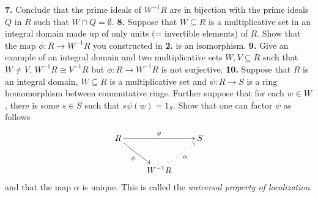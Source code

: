 \documentclass[11pt]{amsart}
\theoremstyle{theorem}
\renewcommand{\to}[1][]{\xrightarrow{\ #1\ }}
\begin{document}
\vskip 200pt
\noindent
{\bf 7.}  Conclude that the prime ideals of $W^{-1} R$ are in bijection with the prime ideals $Q$ in $R$ such that $W \cap Q = \emptyset$.
\vskip 150pt
\noindent
{\bf 8.}  Suppose that $W \subseteq R$ is a multiplicative set in an integral domain made up of only units (= invertible elements) of $R$.  Show that the map $\phi : R \to W^{-1} R$ you constructed in {\bf 2.} is an isomorphism.
\newpage
\noindent
{\bf 9.}  Give an example of an integral domain and two multiplicative sets $W, V \subseteq R$ such that $W \neq V$, $W^{-1} R \cong V^{-1} R$ but $\phi : R \to W^{-1} R$ is not surjective.
\vskip 200pt
\noindent
{\bf 10.}  Suppose that $R$ is an integral domain, $W \subseteq R$ is a multiplicative set and $\psi : R \to S$ is a ring homomorphism between commutative rings.  Further suppose that for each $w \in W$, there is some $s \in S$ such that $s \psi(w) = 1_S$.  Show that one can factor $\psi$ as follows
\[
\xymatrix{
R \ar[dr]_-{\phi} \ar[rr]^{\psi} & & S\\
& W^{-1} R \ar@{.>}[ur]_-{\alpha}
}
\]
and that the map $\alpha$ is unique.  This is called the \emph{universal property of localization}.
\end{document}
